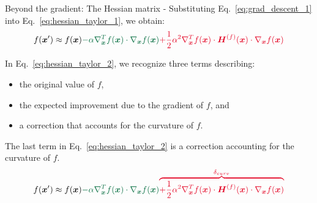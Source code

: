 \begin{frame}[t,allowframebreaks]{
    Beyond the gradient: The Hessian matrix -}
    Substituting Eq.~\ref{eq:grad_descent_1} into Eq.~\ref{eq:hessian_taylor_1}, 
    we obtain:
    \vspace{-0.1cm}
    \begin{equation}
        f(\vect{x}^\prime) \approx 
        f(\vect{x}) 
        {\color{cadmiumgreen}
          - \alpha 
           \nabla_{\vect{x}}^{T}f(\vect{x}) \cdot 
           \nabla_{\vect{x}}f(\vect{x})      
        } 
        {\color{cadmiumred}      
           + \frac{1}{2} \alpha^2 
           \nabla_{\vect{x}}^{T}f(\vect{x}) \cdot 
           \vect{H}^{(f)}(\vect{x}) \cdot 
           \nabla_{\vect{x}}f(\vect{x})
        } 
        \label{eq:hessian_taylor_2}
    \end{equation}

    In Eq.~\ref{eq:hessian_taylor_2}, we recognize three terms describing:\\
    \begin{itemize}
        \item the original value of $f$,
        \item the {\color{cadmiumgreen}expected improvement due to the gradient of $f$}, and
        \item a {\color{cadmiumred}correction that accounts for the curvature of $f$}.
    \end{itemize}

    \framebreak


    The last term in Eq.~\ref{eq:hessian_taylor_2} is a
    {\color{cadmiumred}correction accounting for the curvature of $f$}.\\
    \vspace{-0.5cm}
    \begin{equation*}
        f(\vect{x}^\prime) \approx 
        f(\vect{x}) 
        {\color{cadmiumgreen}
          - \alpha 
           \nabla_{\vect{x}}^{T}f(\vect{x}) \cdot 
           \nabla_{\vect{x}}f(\vect{x})      
        } 
        {\color{cadmiumred}    
         \overbrace{  
           + \frac{1}{2} \alpha^2 
           \nabla_{\vect{x}}^{T}f(\vect{x}) \cdot 
           \vect{H}^{(f)}(\vect{x}) \cdot 
           \nabla_{\vect{x}}f(\vect{x})
         }^\text{$\delta_{curv}$}
        } 
    \end{equation*}


\end{frame}

